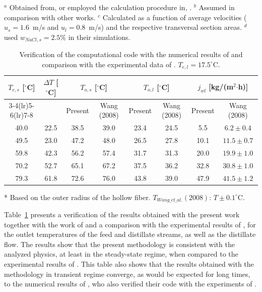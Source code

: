 \documentclass[14pt,letterpaper,fleqn]{extarticle}
\begin{document}
\begin{table}[!htbp]
\smallskip\footnotesize
$^a$ Obtained from, or employed the calculation procedure in, \citet{Kim2014}.
$^b$ Assumed in comparison with other works.
$^c$ Calculated as a function of average velocities ($u_s = 1.6$~m/s and $u_l = 0.8$~m/s)
and the respective transversal section areas.
$^d$ \citet{Lisboa2021} used $w_{NaCl,s} = 2.5\%$ in their simulations.
\end{table}

\begin{table}[!htbp]
\centering
\caption{Verification of the computational code with the numerical results of
\citet{Lisboa2021} and comparison with the experimental data of \citet{Wang2008}.
$T_{e,l} = 17.5^\circ$C.}
\label{tab:verify}
\small
\begin{tabular}{cccccccc}
\toprule
$T_{e,s}$ [$^\circ$C] & $\Delta T$ [$^\circ$C]
  & \multicolumn{2}{c}{$T_{o,s}$ [$^\circ$C]}
  & \multicolumn{2}{c}{$T_{o,l}$ [$^\circ$C]}
  & \multicolumn{2}{c}{$j_{wl}$ [kg/(m$^2$$\cdot$h)]} \\
\cmidrule(lr){3-4}\cmidrule(lr){5-6}\cmidrule(lr){7-8}
 & & Present & Wang (2008) & Present & Wang (2008) & Present & Wang (2008) \\
\midrule
40.0 & 22.5 & 38.5 & 39.0 & 23.4 & 24.5 & 5.5  & $6.2 \pm 0.4$ \\
49.5 & 23.0 & 47.2 & 48.0 & 26.5 & 27.8 & 10.1 & $11.5 \pm 0.7$ \\
59.8 & 42.3 & 56.2 & 57.4 & 31.7 & 31.3 & 20.0 & $19.9 \pm 1.0$ \\
70.2 & 52.7 & 65.1 & 67.2 & 37.5 & 36.2 & 32.8 & $30.8 \pm 1.0$ \\
79.3 & 61.8 & 72.6 & 76.0 & 43.8 & 39.0 & 47.9 & $41.5 \pm 1.2$ \\
\bottomrule
\end{tabular}

\smallskip\footnotesize
* Based on the outer radius of the hollow fiber. $T_{Wang\_et\_al.}(2008)$: $T \pm 0.1^\circ$C.
\end{table}

Table~\ref{tab:verify} presents a verification of the results obtained with the present
work together with the work of \citet{Lisboa2021} and a comparison with the experimental
results of \citet{Wang2008}, for the outlet temperatures of the feed and distillate
streams, as well as the distillate flow. The results show that the present methodology
is consistent with the analyzed physics, at least in the steady-state regime, when
compared to the experimental results of \citet{Wang2008}. This table also shows that the
results obtained with the methodology in transient regime converge, as would be expected
for long times, to the numerical results of \citet{Lisboa2021}, who also verified their
code with the experiments of \citet{Wang2008}.
\end{document}
